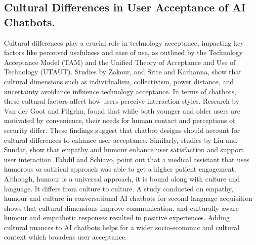\documentclass[conference]{IEEEtran}
\begin{document}
\subsection{Cultural Differences in User Acceptance of AI Chatbots.}
Cultural differences play a crucial role in technology acceptance, impacting key factors like perceived usefulness and ease of use, as outlined by the Technology Acceptance Model (TAM) and the Unified Theory of Acceptance and Use of Technology (UTAUT). Studies by Zakour\cite{b10}, and Srite and Karhanna\cite{b11}, show that cultural dimensions such as individualism, collectivism, power distance, and uncertainty avoidance influence technology acceptance. In terms of chatbots, these cultural factors affect how users perceive interaction styles. Research by Van der Goot and Pilgrim\cite{b12}, found that while both younger and older users are motivated by convenience, their needs for human contact and perceptions of security differ. These findings suggest that chatbot designs should account for cultural differences to enhance user acceptance\cite{b13}. Similarly, studies by Liu and Sundar\cite{b14}, show that empathy and humour enhance user satisfaction and support user interaction. Fahdil and Schiavo\cite{b15}, point out that a medical assistant that uses humorous or satirical approach was able to get a higher patient engagement. Although, humour is a universal approach, it is bound along with culture and language. It differs from culture to culture. A study conducted on empathy, humour and culture in conversational AI chatbots for second language acquisition shows that cultural dimensions improve communication, and culturally aware humour and empathetic responses resulted in positive experiences. Adding cultural nuances to AI chatbots helps for a wider socio-economic and cultural context which broadens user acceptance\cite{b16}.
\end{document}
